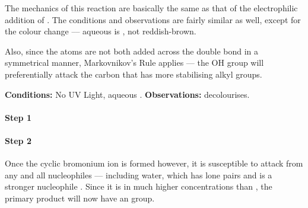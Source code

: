 			The mechanics of this reaction are basically the same as that of the electrophilic addition of .
			The conditions and observations are fairly similar as well, except for the colour change –– aqueous
			 is , not reddish-brown.

			Also, since the  atoms are not both added across the double bond in a symmetrical manner,
			Markovnikov's Rule applies –– the OH group will preferentially attack the carbon that has more stabilising alkyl groups.

			\vspace{1.5em}
			\vbox{\textbf{Conditions:}	\tabto{35mm}No UV Light, aqueous .}	%
			\vbox{\textbf{Observations:}\tabto{35mm}  decolourises.}



			\paragraph{Step 1}



			\paragraph{Step 2}

			Once the cyclic bromonium ion is formed however, it is susceptible to attack from
			any and all nucleophiles –– including water, which has lone pairs and is a stronger nucleophile . Since it is in much higher
			concentrations than , the primary product will now have an  group.

